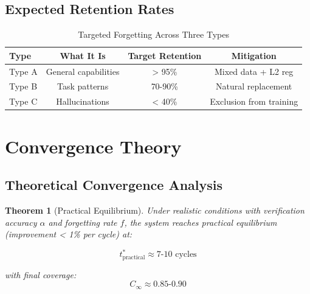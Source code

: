 \documentclass[12pt,a4paper]{article}
\newtheorem{theorem}{Theorem}[section]
\theoremstyle{definition}
\begin{document}
\subsection{Expected Retention Rates}

\begin{table}[htbp]
\centering
\caption{Targeted Forgetting Across Three Types}
\begin{tabular}{lccc}
\toprule
\textbf{Type} & \textbf{What It Is} & \textbf{Target Retention} & \textbf{Mitigation} \\
\midrule
Type A & General capabilities & > 95\% & Mixed data + L2 reg \\
Type B & Task patterns & 70-90\% & Natural replacement \\
Type C & Hallucinations & < 40\% & Exclusion from training \\
\bottomrule
\end{tabular}
\end{table}

\newpage

\section{Convergence Theory}

\subsection{Theoretical Convergence Analysis}

\begin{theorem}[Practical Equilibrium]
\label{thm:equilibrium}
Under realistic conditions with verification accuracy $\alpha$ and forgetting rate $f$, the system reaches practical equilibrium (improvement < 1\% per cycle) at:

\begin{equation}
t_{\text{practical}}^* \approx 7\text{-}10 \text{ cycles}
\end{equation}

with final coverage:
\begin{equation}
C_{\infty} \approx 0.85\text{-}0.90
\end{equation}
\end{theorem}
\end{document}
